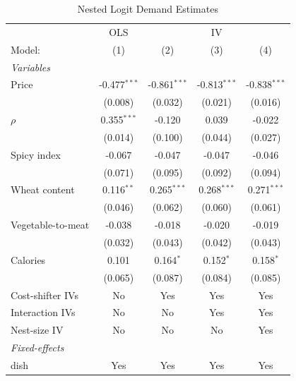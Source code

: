 
\begin{table}[H]
   \caption{\label{tab:nested-logit} Nested Logit Demand Estimates}
   \centering
   \begin{tabular}{lcccc}
      \tabularnewline \midrule \midrule
       & OLS & \multicolumn{3}{c}{IV} \\ 
      Model:            & (1)            & (2)            & (3)            & (4)\\  
      \midrule
      \emph{Variables}\\
      Price             & -0.477$^{***}$ & -0.861$^{***}$ & -0.813$^{***}$ & -0.838$^{***}$\\   
                        & (0.008)        & (0.032)        & (0.021)        & (0.016)\\   
      $\rho$            & 0.355$^{***}$  & -0.120         & 0.039          & -0.022\\   
                        & (0.014)        & (0.100)        & (0.044)        & (0.027)\\   
      Spicy index       & -0.067         & -0.047         & -0.047         & -0.046\\   
                        & (0.071)        & (0.095)        & (0.092)        & (0.094)\\   
      Wheat content     & 0.116$^{**}$   & 0.265$^{***}$  & 0.268$^{***}$  & 0.271$^{***}$\\   
                        & (0.046)        & (0.062)        & (0.060)        & (0.061)\\   
      Vegetable-to-meat & -0.038         & -0.018         & -0.020         & -0.019\\   
                        & (0.032)        & (0.043)        & (0.042)        & (0.043)\\   
      Calories          & 0.101          & 0.164$^{*}$    & 0.152$^{*}$    & 0.158$^{*}$\\   
                        & (0.065)        & (0.087)        & (0.084)        & (0.085)\\   
      Cost-shifter IVs  & No             & Yes            & Yes            & Yes\\  
      Interaction IVs   & No             & No             & Yes            & Yes\\  
      Nest-size IV      & No             & No             & No             & Yes\\  
      \midrule
      \emph{Fixed-effects}\\
      dish              & Yes            & Yes            & Yes            & Yes\\  

\end{tabular}
\end{table}
